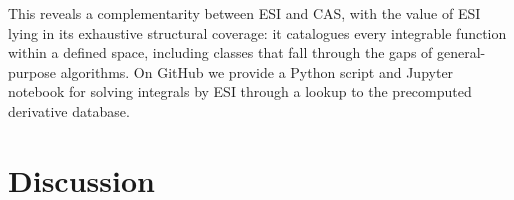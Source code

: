 \documentclass[preprint,12pt,authoryear]{elsarticle}
\newcommand{\hd}[1]{{\color{red}\textbf{[HD: #1]}}}
\begin{document}

This reveals a complementarity between ESI and CAS, with the value of ESI lying
in its exhaustive structural coverage: it catalogues every integrable function within a defined space, including classes that fall through the gaps of general-purpose algorithms.
On GitHub we provide a Python script and Jupyter notebook for solving integrals by ESI through a lookup to the precomputed derivative database.


\section{Discussion}
\label{sec:discussion}
\end{document}
